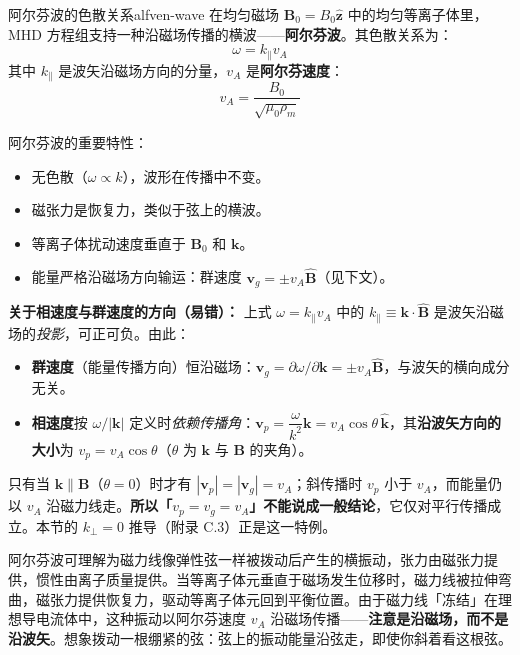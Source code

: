 \documentclass[12pt,a4paper,openany,oneside]{book}
\newcommand{\vect}[1]{\bm{#1}}
\newcommand{\unitvec}[1]{\hat{\vect{#1}}}
\begin{document}
\begin{theorem}{阿尔芬波的色散关系}{alfven-wave}
在均匀磁场 $\vect{B}_0 = B_0\unitvec{z}$ 中的均匀等离子体里，MHD 方程组支持一种沿磁场传播的横波——\textbf{阿尔芬波}。其色散关系为：
\[
\omega = k_\parallel v_A
\]
其中 $k_\parallel$ 是波矢沿磁场方向的分量，$v_A$ 是\textbf{阿尔芬速度}：
\[
v_A = \frac{B_0}{\sqrt{\mu_0\rho_m}}
\]

阿尔芬波的重要特性：
\begin{itemize}
\item 无色散（$\omega \propto k$），波形在传播中不变。
\item 磁张力是恢复力，类似于弦上的横波。
\item 等离子体扰动速度垂直于 $\vect{B}_0$ 和 $\vect{k}$。
\item 能量严格沿磁场方向输运：群速度 $\vect{v}_g = \pm v_A\unitvec{B}$（见下文）。
\end{itemize}

\textbf{关于相速度与群速度的方向（易错）：} 上式 $\omega=k_\parallel v_A$ 中的 $k_\parallel\equiv\vect{k}\cdot\unitvec{B}$ 是波矢沿磁场的\emph{投影}，可正可负。由此：
\begin{itemize}
\item \textbf{群速度}（能量传播方向）恒沿磁场：$\vect{v}_g = \partial\omega/\partial\vect{k} = \pm v_A\unitvec{B}$，与波矢的横向成分无关。
\item \textbf{相速度}按 $\omega/|\vect{k}|$ 定义时\emph{依赖传播角}：$\vect{v}_p = \dfrac{\omega}{k^2}\vect{k} = v_A\cos\theta\,\unitvec{k}$，其\textbf{沿波矢方向的大小}为 $v_p = v_A\cos\theta$（$\theta$ 为 $\vect{k}$ 与 $\vect{B}$ 的夹角）。
\end{itemize}
只有当 $\vect{k}\parallel\vect{B}$（$\theta=0$）时才有 $|\vect{v}_p|=|\vect{v}_g|=v_A$；斜传播时 $v_p$ 小于 $v_A$，而能量仍以 $v_A$ 沿磁力线走。\textbf{所以「$v_p=v_g=v_A$」不能说成一般结论}，它仅对平行传播成立。本节的 $k_\perp=0$ 推导（附录 C.3）正是这一特例。
\end{theorem}

阿尔芬波可理解为磁力线像弹性弦一样被拨动后产生的横振动，张力由磁张力提供，惯性由离子质量提供。当等离子体元垂直于磁场发生位移时，磁力线被拉伸弯曲，磁张力提供恢复力，驱动等离子体元回到平衡位置。由于磁力线「冻结」在理想导电流体中，这种振动以阿尔芬速度 $v_A$ 沿磁场传播——\textbf{注意是沿磁场，而不是沿波矢}。想象拨动一根绷紧的弦：弦上的振动能量沿弦走，即使你斜着看这根弦。
\end{document}
